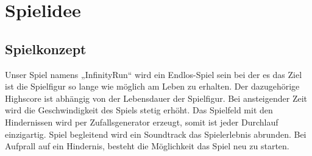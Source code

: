 \section{Spielidee}
\subsection{Spielkonzept}
Unser Spiel namens „InfinityRun“ wird ein Endlos-Spiel sein bei der es das Ziel ist die Spielfigur so lange wie möglich am Leben zu erhalten. Der dazugehörige Highscore ist abhängig von der Lebensdauer der Spielfigur. Bei ansteigender Zeit wird die Geschwindigkeit des Spiels stetig erhöht. Das Spielfeld mit den Hindernissen wird per Zufallsgenerator erzeugt, somit ist jeder Durchlauf einzigartig. Spiel begleitend wird ein Soundtrack das Spielerlebnis abrunden. Bei Aufprall auf ein Hindernis, besteht die Möglichkeit das Spiel neu zu starten.
\newpage
